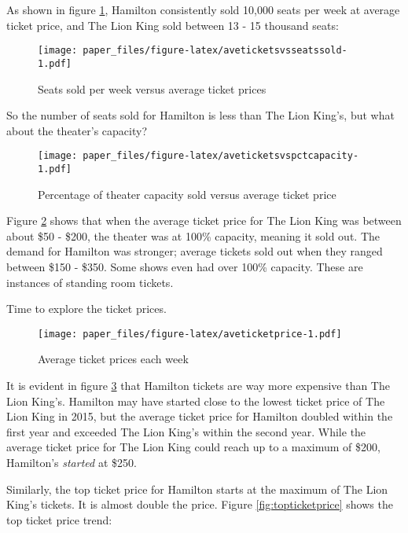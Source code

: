\documentclass[
]{article}
\begin{document}
\newpage

As shown in figure \ref{fig:aveticketsvsseatssold}, Hamilton consistently sold 10,000 seats per week at average ticket price, and The Lion King sold between 13 - 15 thousand seats:

\begin{figure}
\centering
\texttt{[image: paper\_files/figure-latex/aveticketsvsseatssold-1.pdf]}
\caption{\label{fig:aveticketsvsseatssold}Seats sold per week versus average ticket prices}
\end{figure}

\newpage

So the number of seats sold for Hamilton is less than The Lion King's, but what about the theater's capacity?

\begin{figure}
\centering
\texttt{[image: paper\_files/figure-latex/aveticketsvspctcapacity-1.pdf]}
\caption{\label{fig:aveticketsvspctcapacity}Percentage of theater capacity sold versus average ticket price}
\end{figure}

Figure \ref{fig:aveticketsvspctcapacity} shows that when the average ticket price for The Lion King was between about \$50 - \$200, the theater was at 100\% capacity, meaning it sold out. The demand for Hamilton was stronger; average tickets sold out when they ranged between \$150 - \$350. Some shows even had over 100\% capacity. These are instances of standing room tickets.

\newpage

Time to explore the ticket prices.

\begin{figure}
\centering
\texttt{[image: paper\_files/figure-latex/aveticketprice-1.pdf]}
\caption{\label{fig:aveticketprice}Average ticket prices each week}
\end{figure}

It is evident in figure \ref{fig:aveticketprice} that Hamilton tickets are way more expensive than The Lion King's. Hamilton may have started close to the lowest ticket price of The Lion King in 2015, but the average ticket price for Hamilton doubled within the first year and exceeded The Lion King's within the second year. While the average ticket price for The Lion King could reach up to a maximum of \$200, Hamilton's \emph{started} at \$250.

\newpage

Similarly, the top ticket price for Hamilton starts at the maximum of The Lion King's tickets. It is almost double the price. Figure \ref{fig:topticketprice} shows the top ticket price trend:
\end{document}
